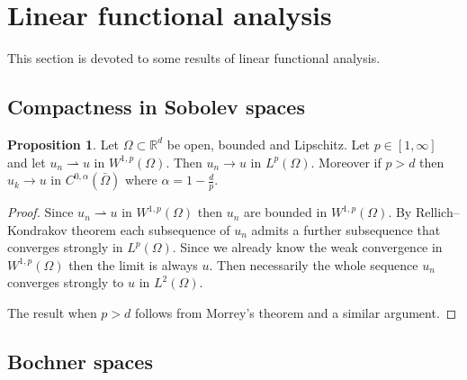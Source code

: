 \documentclass[a4paper,10pt,oneside]{amsbook}
\numberwithin{section}{chapter}
\numberwithin{equation}{chapter}
\theoremstyle{definition}
\newtheorem{prop}{Proposition}[chapter]
\begin{document}
\section{Linear functional analysis}

This section is devoted to some results of linear functional analysis.

\subsection{Compactness in Sobolev spaces}

\begin{prop}
\label{prop:sobolev-weak-lp-strong}
Let $\Omega\subset\mathbb{R}^d$ be open, bounded and Lipschitz. Let $p\in[1,\infty]$ and let $u_n\rightharpoonup u$ in $W^{1,p}(\Omega)$. Then $u_n\to u$ in $L^p(\Omega)$. Moreover if $p>d$ then $u_k\to u$ in $C^{0,\alpha}(\bar{\Omega})$ where $\alpha=1-\frac{d}{p}$.
\end{prop}
\begin{proof}
Since $u_n\rightharpoonup u$ in $W^{1,p}(\Omega)$ then $u_n$ are bounded in $W^{1,p}(\Omega)$. By Rellich--Kondrakov theorem each subsequence of $u_n$ admits a further subsequence that converges strongly in $L^p(\Omega)$. Since we already know the weak convergence in $W^{1,p}(\Omega)$ then the limit is always $u$. Then necessarily the whole sequence $u_n$ converges strongly to $u$ in $L^2(\Omega)$.

The result when $p>d$ follows from Morrey's theorem and a similar argument.
\end{proof}

\subsection{Bochner spaces}
\end{document}
